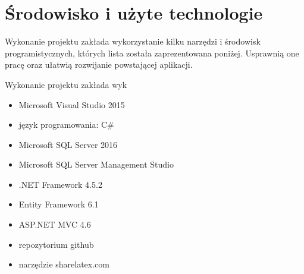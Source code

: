 \section{Środowisko i użyte technologie}
Wykonanie projektu zakłada wykorzystanie kilku narzędzi i środowisk programistycznych, których lista została zaprezentowana poniżej. Usprawnią one pracę oraz ułatwią rozwijanie powstającej aplikacji.

Wykonanie projektu zakłada wyk
\begin{itemize}
    \item Microsoft Visual Studio 2015
    \item język programowania: C#
    \item Microsoft SQL Server 2016
    \item Microsoft SQL Server Management Studio
    \item .NET Framework 4.5.2
    \item Entity Framework 6.1
    \item ASP.NET MVC 4.6
    \item repozytorium github
    \item narzędzie sharelatex.com
\end{itemize}